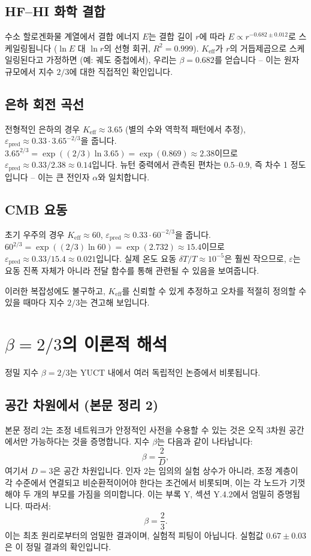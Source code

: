 \documentclass[11pt,a4paper]{article}
\newcommand{\Keff}{K_{\mathrm{eff}}}
\newcommand{\eps}{\varepsilon}
\begin{document}
	\subsection*{HF–HI 화학 결합}
	수소 할로겐화물 계열에서 결합 에너지 \(E\)는 결합 길이 \(r\)에 따라 \(E \propto r^{-0.682 \pm 0.012}\)로 스케일링됩니다 (\(\ln E\) 대 \(\ln r\)의 선형 회귀, \(R^2 = 0.999\)). \(\Keff\)가 \(r\)의 거듭제곱으로 스케일링된다고 가정하면 (예: 궤도 중첩에서), 우리는 \(\beta = 0.682\)를 얻습니다 – 이는 원자 규모에서 지수 \(2/3\)에 대한 직접적인 확인입니다.
	
	\subsection*{은하 회전 곡선}
	전형적인 은하의 경우 \(\Keff \approx 3.65\) (별의 수와 역학적 패턴에서 추정), \(\eps_{\text{pred}} \approx 0.33 \cdot 3.65^{-2/3}\)을 줍니다. \(3.65^{2/3} = \exp((2/3)\ln 3.65) = \exp(0.869) \approx 2.38\)이므로 \(\eps_{\text{pred}} \approx 0.33/2.38 \approx 0.14\)입니다. 뉴턴 중력에서 관측된 편차는 \(0.5\)–\(0.9\), 즉 차수 1 정도입니다 – 이는 큰 전인자 \(\alpha\)와 일치합니다.
	
	\subsection*{CMB 요동}
	초기 우주의 경우 \(\Keff \approx 60\), \(\eps_{\text{pred}} \approx 0.33 \cdot 60^{-2/3}\)을 줍니다. \(60^{2/3} = \exp((2/3)\ln 60) = \exp(2.732) \approx 15.4\)이므로 \(\eps_{\text{pred}} \approx 0.33/15.4 \approx 0.021\)입니다. 실제 온도 요동 \(\delta T/T \approx 10^{-5}\)은 훨씬 작으므로, \(\eps\)는 요동 진폭 자체가 아니라 전달 함수를 통해 관련될 수 있음을 보여줍니다.
	
	이러한 복잡성에도 불구하고, \(\Keff\)를 신뢰할 수 있게 추정하고 오차를 적절히 정의할 수 있을 때마다 지수 \(2/3\)는 견고해 보입니다.
	
	\section{\(\beta = 2/3\)의 이론적 해석}
	\label{sec:derivation}
	
	정밀 지수 \(\beta = 2/3\)는 YUCT 내에서 여러 독립적인 논증에서 비롯됩니다.
	
	\subsection*{공간 차원에서 (본문 정리 2)}
	본문 정리 2는 조정 네트워크가 안정적인 사전을 수용할 수 있는 것은 오직 3차원 공간에서만 가능하다는 것을 증명합니다. 지수 \(\beta\)는 다음과 같이 나타납니다:
	\[
	\beta = \frac{2}{D},
	\]
	여기서 \(D = 3\)은 공간 차원입니다. 인자 2는 임의의 실험 상수가 아니라, 조정 계층이 각 수준에서 연결되고 비순환적이어야 한다는 조건에서 비롯되며, 이는 각 노드가 기껏해야 두 개의 부모를 가짐을 의미합니다. 이는 부록 Y, 섹션 Y.4.2에서 엄밀히 증명됩니다. 따라서:
	\[
	\beta = \frac{2}{3}.
	\]
	이는 최초 원리로부터의 엄밀한 결과이며, 실험적 피팅이 아닙니다. 실험값 \(0.67 \pm 0.03\)은 이 정밀 결과의 확인입니다.
	
\end{document}
